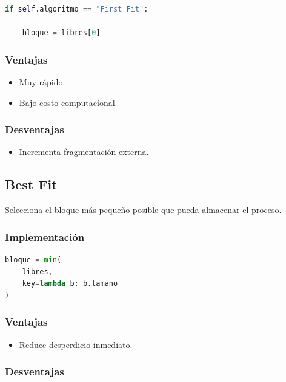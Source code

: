 \begin{lstlisting}[language=Python]
if self.algoritmo == "First Fit":

    bloque = libres[0]
\end{lstlisting}

\subsubsection{Ventajas}

\begin{itemize}
    \item Muy rápido.
    \item Bajo costo computacional.
\end{itemize}

\subsubsection{Desventajas}

\begin{itemize}
    \item Incrementa fragmentación externa.
\end{itemize}


\subsection{Best Fit}

Selecciona el bloque más pequeño posible que pueda almacenar el proceso.

\subsubsection{Implementación}

\begin{lstlisting}[language=Python]
bloque = min(
    libres,
    key=lambda b: b.tamano
)
\end{lstlisting}

\subsubsection{Ventajas}

\begin{itemize}
    \item Reduce desperdicio inmediato.
\end{itemize}

\subsubsection{Desventajas}

